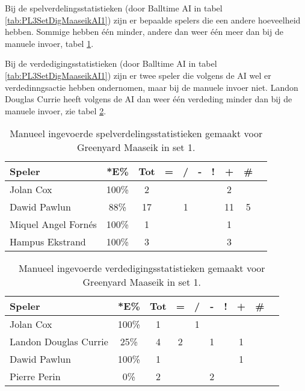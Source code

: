 Bij de spelverdelingsstatistieken (door Balltime AI in tabel \ref{tab:PL3SetDigMaaseikAI1}) zijn er bepaalde spelers die een andere hoeveelheid hebben. Sommige hebben één minder, andere dan weer één meer dan bij de manuele invoer, tabel \ref{tab:PL3SetMaaseikMan1}.

Bij de verdedigingsstatistieken (door Balltime AI in tabel \ref{tab:PL3SetDigMaaseikAI1}) zijn er twee speler die volgens de AI wel er verdedinngsactie hebben ondernomen, maar bij de manuele invoer niet. Landon Douglas Currie heeft volgens de AI dan weer één verdeding minder dan bij de manuele invoer, zie tabel \ref{tab:PL3DigMaaseikMan1}.

\begin{table}[ht!]
    \centering
    \scriptsize
    \begin{tabular}{|l|c|c|c|c|c|c|c|c|c|} \hline
        \textbf{Speler} & *E\% & Tot & = & / & - & ! & + & \# \\ \hline
        Jolan Cox & 100\% & 2 &  &  &  &  & 2 &  \\ 
        Dawid Pawlun & 88\% & 17 &  & 1 &  &  & 11 & 5 \\ 
        Miquel Angel Fornés & 100\% & 1 &  &  &  &  & 1 &  \\ 
        Hampus Ekstrand & 100\% & 3 &  &  &  &  & 3 &  \\ \hline
    \end{tabular}
    \caption[Manueel ingevoerde spelverdelingsstatistieken gemaakt voor Greenyard Maaseik in set 1]{\label{tab:PL3SetMaaseikMan1}Manueel ingevoerde spelverdelingsstatistieken gemaakt voor Greenyard Maaseik in set 1.}
\end{table}

\begin{table}[ht!]
    \centering
    \scriptsize
    \begin{tabular}{|l|c|c|c|c|c|c|c|c|c|} \hline
        \textbf{Speler} & *E\% & Tot & = & / & - & ! & + & \# \\ \hline
        Jolan Cox & 100\% & 1 &  & 1 &  &  &  & \\
        Landon Douglas Currie & 25\% & 4 & 2 &  & 1 &  & 1 & \\ 
        Dawid Pawlun & 100\% & 1 &  &  &  &  & 1 & \\
        Pierre Perin & 0\% & 2 &  &  & 2 &  &  &  \\ \hline
    \end{tabular}
    \caption[Manueel ingevoerde verdedigingsstatistieken gemaakt voor Greenyard Maaseik in set 1]{\label{tab:PL3DigMaaseikMan1}Manueel ingevoerde verdedigingsstatistieken gemaakt voor Greenyard Maaseik in set 1.}
\end{table}

